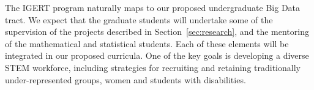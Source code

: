 The IGERT program naturally maps to our proposed undergraduate Big Data tract. We expect that the graduate students will undertake some of the supervision of the projects described in Section~\ref{sec:research}, and the mentoring of the mathematical and statistical students. Each of these elements will be integrated in our proposed curricula. One of the key goals is developing a diverse STEM workforce, including strategies for recruiting and retaining traditionally under-represented groups, women and students with disabilities. 